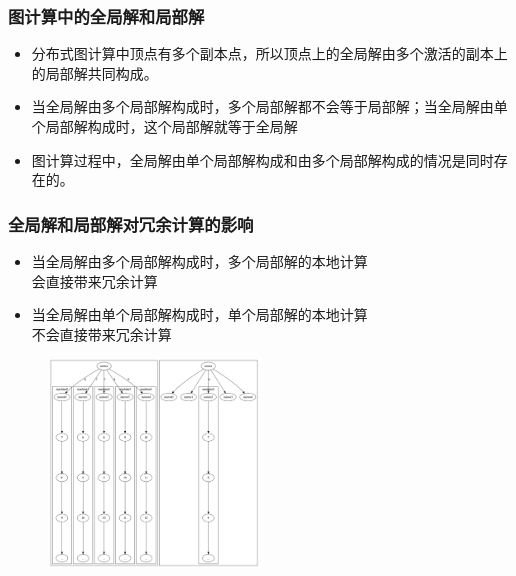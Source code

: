 \documentclass[10pt]{beamer}
\begin{document}
\begin{frame}%
  \frametitle{图计算中的全局解和局部解}
  \begin{block}
    {}
    \begin{itemize}
      \item 分布式图计算中顶点有多个副本点，所以顶点上的全局解由多个激活的副本上的局部解共同构成。
      \item 当全局解由多个局部解构成时，多个局部解都不会等于局部解；当全局解由单个局部解构成时，这个局部解就等于全局解
      \item 图计算过程中，全局解由单个局部解构成和由多个局部解构成的情况是同时存在的。
    \end{itemize}
  \end{block}
\end{frame}
\begin{frame}%
  \frametitle{全局解和局部解对冗余计算的影响}
  \begin{block}
    {}
    \begin{itemize}
      \item 当全局解由多个局部解构成时，多个局部解的本地计算\\会直接带来冗余计算
      \item 当全局解由单个局部解构成时，单个局部解的本地计算\\不会直接带来冗余计算
    \end{itemize}
  \end{block}
  \vspace{-0.5em}
  \begin{figure}[!htbp]
    \centering
    \includegraphics[width=0.5\textwidth]{Img/useless_and_local}
  \end{figure}
\end{frame}
\end{document}
